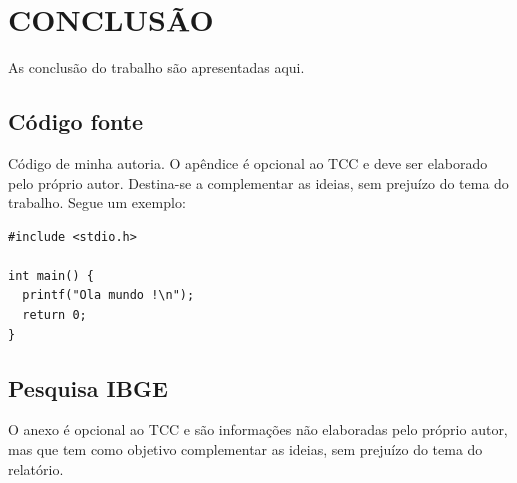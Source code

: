 \documentclass[
	12pt,				%
	openright,			%
	oneside,			%
	a4paper,			%
	chapter=TITLE,		%
	section=TITLE,		%
	english,			%
	french,				%
	spanish,			%
	brazil				%
	]{abntex2}
\begin{document}
\chapter{CONCLUSÃO}

As conclusão do trabalho são apresentadas aqui.





%
%


\begin{apendicesenv}

\chapter{Código fonte}
Código de minha autoria. O apêndice é opcional ao TCC e deve ser elaborado pelo próprio autor. Destina-se a complementar as ideias, sem prejuízo do tema do trabalho. Segue um exemplo:

\scriptsize
\begin{lstlisting}
#include <stdio.h>

int main() {
  printf("Ola mundo !\n");
  return 0;
}
\end{lstlisting}

\end{apendicesenv}

\begin{anexosenv}

\chapter{Pesquisa IBGE}
O anexo é opcional ao TCC e são informações não elaboradas pelo próprio autor, mas que tem como objetivo complementar as ideias, sem prejuízo do tema do relatório.

\end{anexosenv}
\end{document}
